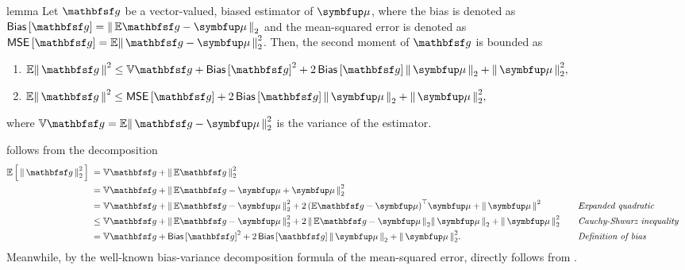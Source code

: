\begin{theoremEnd}{lemma}\label{thm:second_moment_bound}
  Let \(\rvvg\) be a vector-valued, biased estimator of \(\vmu\), where the bias is denoted as \(\mathsf{Bias}\left[\rvvg\right] = \norm{ \mathbb{E}\rvvg - \vmu }_2\) and the mean-squared error is denoted as \(\mathsf{MSE}\left[\rvvg\right] = \mathbb{E}\norm{\rvvg - \vmu }_2^2\).
  Then, the second moment of \(\rvvg\) is bounded as
  \begin{enumerate}
  \item[\ding{182}]
  \(
    \mathbb{E}\norm{\rvvg}^2 
    \leq
    \mathbb{V}{\rvvg} + {\mathsf{Bias}\left[\rvvg\right]}^2 + 2\, \mathsf{Bias}\left[\rvvg\right] \norm{\vmu}_2 + \norm{\vmu}^2_2,
  \)
  \item[\ding{183}]
  \(
    \mathbb{E}\norm{\rvvg}^2 
    \leq
    \mathsf{MSE}\left[{\rvvg}\right] + 2\, \mathsf{Bias}\left[\rvvg\right] \norm{\vmu}_2 + \norm{\vmu}^2_2,
  \)
  \end{enumerate}
  where \(\mathbb{V}\rvvg = \mathbb{E}\norm{ \rvvg - \vmu }_2^2\) is the variance of the estimator.
\end{theoremEnd}
\begin{proofEnd}
   follows from the decomposition
  {%
  \begin{alignat}{2}
    \E{ \norm{\rvvg}^2_{2} }
    &\;=
    \mathbb{V}{ \rvvg }
    +
    \norm{ \mathbb{E}{ \rvvg } }_2^2
    \nonumber
    \\
    &\;=
    \mathbb{V}{ \rvvg }
    +
    \norm{
      \mathbb{E}{ \rvvg } - \vmu  + \vmu
    }_2^2
    \nonumber
    \\
    &\;=
    \mathbb{V}{ \rvvg }
    +
    \norm{
      \mathbb{E}{ \rvvg } - \vmu  
    }_2^2
    \nonumber
    +
    2 \, {\left(
      \mathbb{E}\rvvg - \vmu 
    \right)}^{\top}
    \vmu
    + 
    \norm{\vmu}^2
    &&\quad\text{\textit{Expanded quadratic}}
    \nonumber
    \\
    &\;\leq
    \mathbb{V}{ \rvvg }
    +
    \norm{
      \mathbb{E}{ \rvvg   } - \vmu 
    }_2^2
    +
    2 \,\norm{
      \mathbb{E}{ \rvvg  } - \vmu
    }_2
    \norm{\vmu}_2
    + 
    \norm{
      \vmu
    }_2^2
    \nonumber
    &&\quad\text{\textit{Cauchy-Shwarz inequality}}
    \\
    &\;=
    \mathbb{V}{ \rvvg  }
    +
    \mathsf{Bias}\left[\rvvg\right]^2
    +
    2 \,\mathsf{Bias}\left[\rvvg\right]
    \norm{\vmu}_2
    + 
    \norm{
      \vmu
    }_2^2.
    \nonumber
    &&\quad\text{\textit{Definition of bias}}
  \end{alignat}
  }
  Meanwhile, by the well-known bias-variance decomposition formula of the mean-squared error,  directly follows from .
\end{proofEnd}